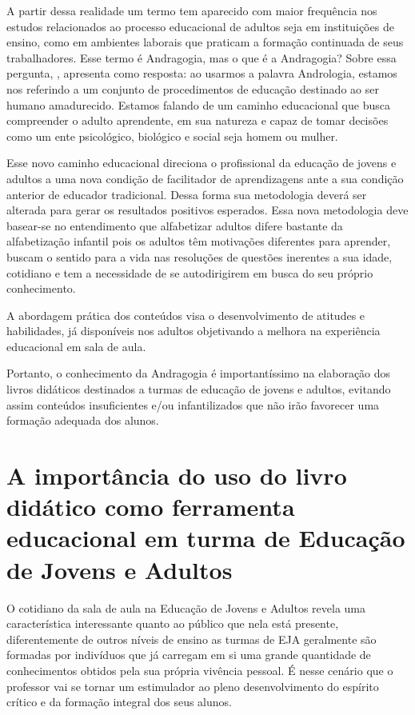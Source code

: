 \begin{refsection}
    A partir dessa realidade um termo tem aparecido com maior frequência nos estudos relacionados ao processo educacional de adultos seja em instituições de ensino, como em ambientes laborais que praticam a formação continuada de seus trabalhadores. Esse termo é Andragogia, mas o que é a Andragogia? Sobre essa pergunta, \textcite{ROSSETTI2013Andragogia}, apresenta como resposta: ao usarmos a palavra Andrologia, estamos nos referindo a um conjunto de procedimentos de educação destinado ao ser humano amadurecido. Estamos falando de um caminho educacional que busca compreender o adulto aprendente, em sua natureza e capaz de tomar decisões como um ente psicológico, biológico e social seja homem ou mulher. 

    Esse novo caminho educacional direciona o profissional da educação de jovens e adultos a uma nova condição de facilitador de aprendizagens ante a sua condição anterior de educador tradicional. Dessa forma sua metodologia deverá ser alterada para gerar os resultados positivos esperados. Essa nova metodologia deve basear-se no entendimento que alfabetizar adultos difere bastante da alfabetização infantil pois os adultos têm motivações diferentes para aprender, buscam o sentido para a vida nas resoluções de questões inerentes a sua idade, cotidiano e tem a necessidade de se autodirigirem em busca do seu próprio conhecimento. 

    A abordagem prática dos conteúdos visa o desenvolvimento de atitudes e habilidades, já disponíveis nos adultos objetivando a melhora na experiência educacional em sala de aula. 

    Portanto, o conhecimento da Andragogia é importantíssimo na elaboração dos livros didáticos destinados a turmas de educação de jovens e adultos, evitando assim conteúdos insuficientes e/ou infantilizados que não irão favorecer uma formação adequada dos alunos. 


    \section{A importância do uso do livro didático como ferramenta educacional em turma de Educação de Jovens e Adultos}

    O cotidiano da sala de aula na Educação de Jovens e Adultos revela uma característica interessante quanto ao público que nela está presente, diferentemente de outros níveis de ensino as turmas de EJA geralmente são formadas por indivíduos que já carregam em si uma grande quantidade de conhecimentos obtidos pela sua própria vivência pessoal. É nesse cenário que o professor vai se tornar um estimulador ao pleno desenvolvimento do espírito crítico e da formação integral dos seus alunos. 


\end{refsection}

